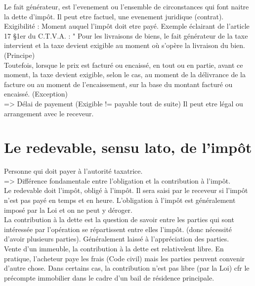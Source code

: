 \documentclass{book}
\begin{document}
Le fait générateur, est l'evenement ou l'ensemble de circonstances qui font naitre la dette d'impôt. Il peut etre factuel, une evenement juridique (contrat).\\

Exigibilité : Moment auquel l'impôt doit etre payé. Exemple éclairant de l'article 17 §1er du C.T.V.A. : " Pour les livraisons de biens, le fait générateur de la taxe intervient et la taxe devient exigible au moment où s'opère la livraison du bien. (Principe) \\

Toutefois, lorsque le prix est facturé ou encaissé, en tout ou en partie, avant ce moment, la taxe devient exigible, selon le cas, au moment de la délivrance de la facture ou au moment de l'encaissement, sur la base du montant facturé ou encaissé. (Exception)\\

=> Délai de payement (Exigible != payable tout de suite) Il peut etre légal ou arrangement avec le receveur.

\section{Le redevable, sensu lato, de l'impôt}

Personne qui doit payer à l'autorité taxatrice.\\

=> Différence fondamentale entre l'obligation et la contribution à l'impôt.\\

Le redevable doit l'impôt, obligé à l'impôt. Il sera saisi par le receveur si l'impôt n'est pas payé en temps et en heure. L'obligation à l'impôt est généralement imposé par la Loi et on ne peut y déroger.\\

La contribution à la dette est la question de savoir entre les parties qui sont intéressée par l'opération se répartissent entre elles l'impôt.  (donc nécessité d'avoir plusieurs parties). Généralement laissé à l'appréciation des parties.\\

Vente d'un immeuble, la contribution à la dette est relativelent libre. En pratique, l'acheteur paye les frais (Code civil) mais les parties peuvent convenir d'autre chose. Dans certains cas, la contribution n'est pas libre (par la Loi) cfr le précompte immobilier dans le cadre d'un bail de résidence principale.\\
\end{document}
